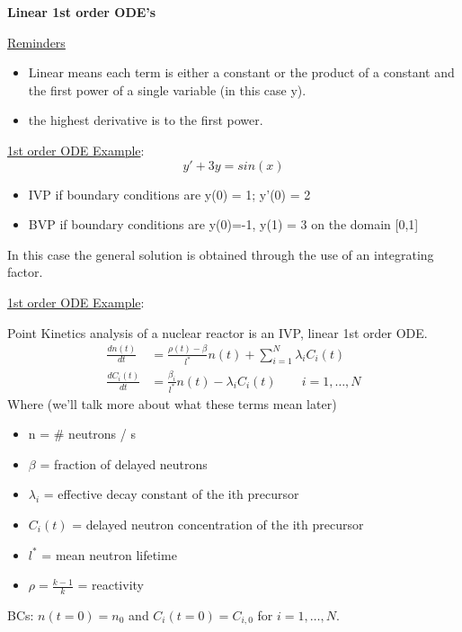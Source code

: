 \documentclass[12pt]{article}
\begin{document}
\noindent \textbf{Linear 1st order ODE's}

\noindent \underline{Reminders}
\begin{itemize}
\item Linear means each term is either a constant or the product of a constant and the first power of a single variable (in this case y).
\item the highest derivative is to the first power.
\end{itemize}

\noindent \underline{1st order ODE Example}:
\begin{equation}
y' + 3y = sin(x) \nonumber
\end{equation}
%
\begin{itemize}
\item IVP if boundary conditions are y(0) = 1; y'(0) = 2
\item BVP if boundary conditions are y(0)=-1, y(1) = 3 on the domain [0,1]
\end{itemize}
%
In this case the general solution is obtained through the use of an integrating factor.

\vspace*{1em}
\noindent \underline{1st order ODE Example}:

Point Kinetics analysis of a nuclear reactor is an IVP, linear 1st order ODE.
%
\begin{align}
\frac{dn(t)}{dt} &= \frac{\rho(t) - \beta}{l^*}n(t) + \sum_{i=1}^{N} \lambda_i C_i(t) \nonumber \\
%
\frac{dC_i(t)}{dt} &= \frac{\beta_i}{l^*}n(t) - \lambda_i C_i(t) \qquad i=1,\dots,N \nonumber
\end{align}
%
Where (we'll talk  more about what these terms mean later)
%
\begin{itemize}
\item n = \# neutrons / s
\item $\beta$ = fraction of delayed neutrons
\item $\lambda_i$ = effective decay constant of the ith precursor
\item $C_i(t)$ = delayed neutron concentration of the ith precursor
\item $l^*$ = mean neutron lifetime
\item $\rho = \frac{k-1}{k}$ = reactivity
\end{itemize}
%
BCs: $n(t=0) = n_0$ and $C_i(t=0) = C_{i,0}$ for $i=1,\dots,N$.
\end{document}
